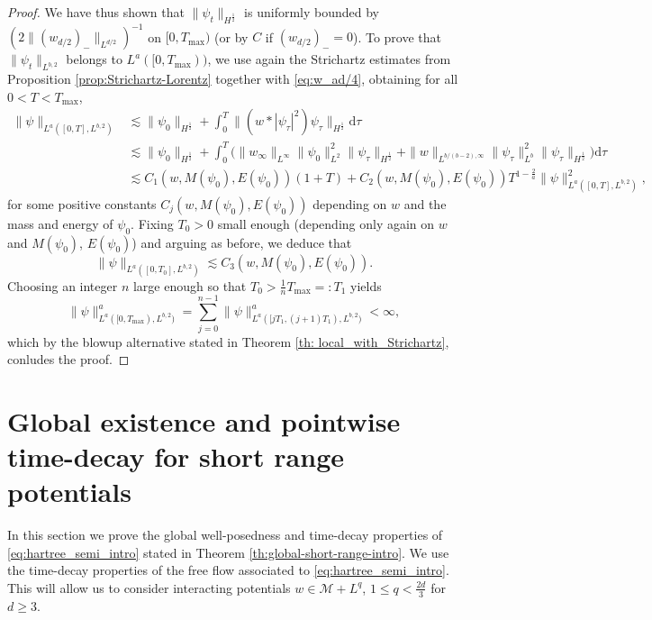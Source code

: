 \documentclass[12pt]{article}
\theoremstyle{plain}
\newcommand{\meas}{\mathcal{M}}
\begin{document}
\begin{proof}
We have thus shown that $\|\psi_t\|_{H^{\frac12}}$ is uniformly bounded by $(2\|(w_{d/2})_-\|_{L^{d/2}})^{-1}$ on $[0,T_{\max})$ (or by $C$ if $(w_{d/2})_-=0$). To prove that $\|\psi_t\|_{L^{b,2}}$ belongs to $L^a([0,T_{\max}))$, we use again the Strichartz estimates from Proposition \ref{prop:Strichartz-Lorentz} together with \eqref{eq:w_ad/4}, obtaining for all $0<T<T_{\max}$,
\begin{align*}
    \|\psi\|_{L^a([0,T],L^{b,2})}&\lesssim\|\psi_0\|_{H^{\frac12}}+\int_0^T\|(w*|\psi_\tau|^2)\psi_\tau\|_{H^{\frac12}}\mathrm{d}\tau\\
    &\lesssim\|\psi_0\|_{H^{\frac12}}+\int_0^T\big(\|w_\infty\|_{L^\infty}\|\psi_0\|^2_{L^2}\|\psi_\tau\|_{H^{\frac12}}+\|w\|_{L^{b/(b-2),\infty}}\|\psi_\tau\|_{L^b}^2\|\psi_\tau\|_{H^{\frac12}}\big)\mathrm{d}\tau\\
    &\lesssim C_1(w,M(\psi_0),E(\psi_0))(1+T)+C_2(w,M(\psi_0),E(\psi_0))T^{1-\frac{2}{a}}\|\psi\|_{L^a([0,T],L^{b,2})}^2,
\end{align*}
for some positive constants $C_j(w,M(\psi_0),E(\psi_0))$ depending on $w$ and the mass and energy of $\psi_0$. Fixing $T_0>0$ small enough (depending only again on $w$ and $M(\psi_0)$, $E(\psi_0)$) and arguing as before, we deduce that
\begin{equation*}
    \|\psi\|_{L^ a([0,T_0],L^{b,2})}\lesssim C_3(w,M(\psi_0),E(\psi_0)).
\end{equation*}
Choosing an integer $n$ large enough so that $T_0>\frac1nT_{\max}=:T_1$ yields
\begin{equation*}
    \|\psi\|_{L^a([0,T_{\max}),L^{b,2})}^a=\sum_{j=0}^{n-1}\|\psi\|^a_{L^a([jT_1,(j+1)T_1),L^{b,2})}<\infty,
\end{equation*}
which by the blowup alternative stated in Theorem \ref{th: local_with_Strichartz}, conludes the proof.
\end{proof}



	\section{Global existence and pointwise time-decay for short range potentials}\label{sec:global-short}
	



In this section we prove the global well-posedness and time-decay properties of  \eqref{eq:hartree_semi_intro} stated in Theorem \ref{th:global-short-range-intro}. We use the time-decay properties of the free flow associated to \eqref{eq:hartree_semi_intro}. This will allow us to consider interacting potentials $w \in \meas + L^{q}$, $ 1\leq q <\frac{2d}{3}$ for $d\geq 3$. 
\end{document}
